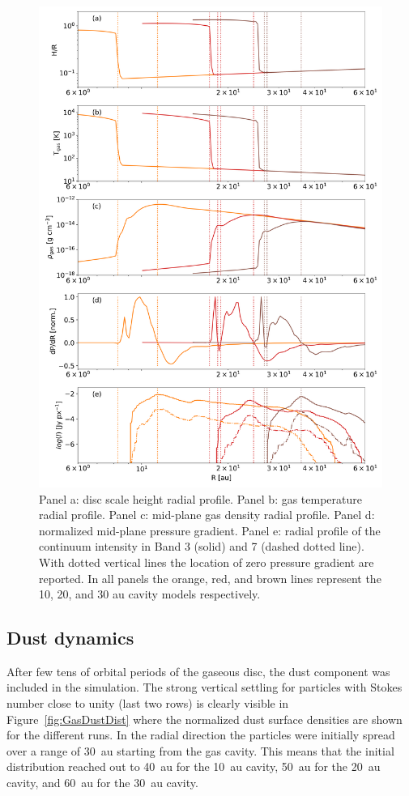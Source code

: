 \documentclass[fleqn,usenatbib]{mnras}
\begin{document}
        \begin{figure}
            \centering
            \includegraphics[width=\columnwidth]{hydro_comp.png}
            \caption{Panel a: disc scale height radial profile. Panel b: gas temperature radial profile. Panel c: mid-plane gas density radial profile. Panel d: normalized mid-plane pressure gradient. Panel e: radial profile of the continuum intensity in Band 3 (solid) and 7 (dashed dotted line). With dotted vertical lines the location of zero pressure gradient are reported. In all panels the orange, red, and brown lines represent the 10, 20, and 30 au cavity models respectively.
            \label{fig:scale-height}}
        \end{figure}
         
    \subsection{Dust dynamics} \label{sec:results-dust}
        After few tens of orbital periods of the gaseous disc, the dust component was included in the simulation.
        The strong vertical settling for particles with Stokes number close to unity (last two rows) is clearly visible in Figure~\ref{fig:GasDustDist} where the normalized dust surface densities are shown for the different runs.
        In the radial direction the particles were initially spread over a range of \SI{30}{au} starting from the gas cavity. This means that the initial distribution reached out to \SI{40}{au} for the \SI{10}{au} cavity, \SI{50}{au} for the \SI{20}{au} cavity, and \SI{60}{au} for the \SI{30}{au} cavity.
\end{document}
